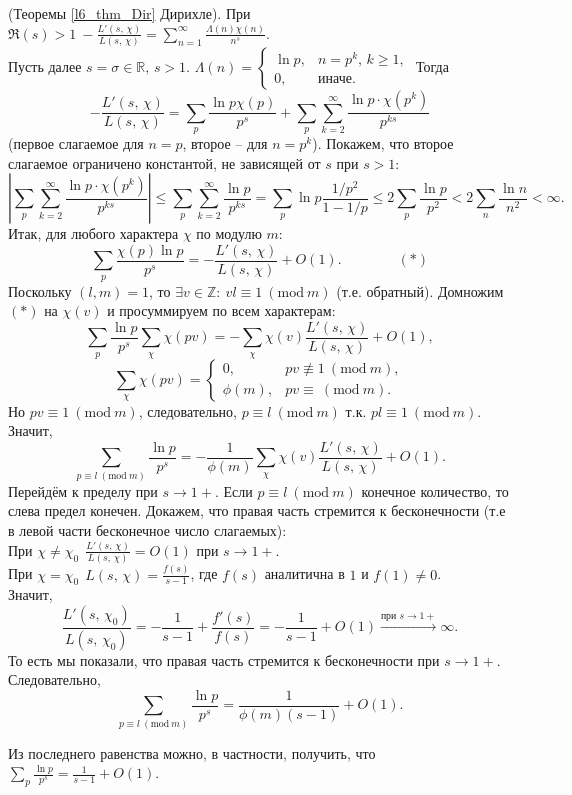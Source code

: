 \begin{pf} (Теоремы \ref{l6_thm_Dir} Дирихле).
	При $\displaystyle \Re(s)>1 \ -\frac{L'(s,\,\chi)}{L(s,\,\chi)} = \sum\limits_{n=1}^\infty \frac{\Lambda(n)\chi(n)}{n^s}$.\\
	Пусть далее $s=\sigma \in \mathbb{R}, \, s>1$. $\Lambda(n) =
	\begin{cases}
		\ln p, & n=p^k,\,k\geq1,\\
		0, & \text{иначе.}
	\end{cases}$
	Тогда
	$$-\frac{L'(s,\,\chi)}{L(s,\,\chi)} = \sum\limits_p \frac{\ln p \chi(p)}{p^s} + \sum\limits_p \sum\limits_{k=2}^\infty \frac{\ln p \cdot \chi\left( p^k \right)}{p^{ks}}$$ (первое слагаемое для $n=p$, второе -- для $n=p^k$). Покажем, что второе слагаемое ограничено константой, не зависящей от $s$ при $s>1$:
	$$\left| \sum\limits_p \sum\limits_{k=2}^\infty \frac{\ln p \cdot \chi\left( p^k \right)}{p^{ks}} \right| \leq \sum\limits_p \sum\limits_{k=2}^\infty \frac{\ln p}{p^{ks}} = \sum\limits_p \ln p \frac{1/p^2}{1-1/p} \leq 2\sum\limits_p \frac{\ln p}{p^2} < 2\sum\limits_n \frac{\ln n}{n^2} < \infty.$$
	Итак, для любого характера $\chi$ по модулю $m$:
	$$\sum\limits_p \frac{\chi(p)\ln p}{p^s} = -\frac{L'(s,\,\chi)}{L(s,\,\chi)} + O(1). \qquad \qquad (\ast)$$
	Поскольку $(l, m) =1$, то $\exists v \in \mathbb{Z}: \ vl \equiv 1 \ (\mathrm{mod} \ m)$ (т.е. обратный).
	Домножим $(\ast)$ на $\chi(v)$ и просуммируем по всем характерам:
	$$\sum\limits_p \frac{\ln p}{p^s} \sum\limits_\chi \chi(pv) = -\sum\limits_\chi \chi(v)\frac{L'(s,\,\chi)}{L(s,\,\chi)} + O(1),$$
	$$\sum\limits_\chi \chi(pv) =
	\begin{cases}
		0, & pv \not\equiv 1 \ (\mathrm{mod} \ m),\\
		\phi(m), & pv \equiv \ (\mathrm{mod} \ m).
	\end{cases}$$
	Но $pv \equiv 1 \ (\mathrm{mod} \ m)$, следовательно, $p \equiv l \ (\mathrm{mod} \ m)$ т.к. $pl \equiv 1 \ (\mathrm{mod} \ m)$. Значит,
	$$\sum\limits_{p \equiv l \ (\mathrm{mod} \ m)} \frac{\ln p}{p^s} = -\frac{1}{\phi(m)} \sum\limits_\chi \chi(v)\frac{L'(s,\,\chi)}{L(s,\,\chi)} + O(1).$$
	Перейдём к пределу при $s \to 1+$. Если $p \equiv l \ (\mathrm{mod} \ m)$ конечное количество, то слева предел конечен. Докажем, что правая часть стремится к бесконечности (т.е в левой части бесконечное число слагаемых):\\
	При $\displaystyle \chi \ne \chi_0 \ \ \frac{L'(s,\,\chi)}{L(s,\,\chi)} = O(1)$ при $s \to 1+$.\\
	При $\displaystyle \chi = \chi_0 \ \ L(s,\,\chi) = \frac{f(s)}{s-1}$, где $f(s)$ аналитична в $1$ и $f(1) \ne 0$.\\
	Значит,
	$$\frac{L'(s,\,\chi_0)}{L(s,\,\chi_0)} = -\frac{1}{s-1} + \frac{f'(s)}{f(s)} = -\frac{1}{s-1} + O(1) \xrightarrow{\text{при } s\to1+} \infty.$$
	То есть мы показали, что правая часть стремится к бесконечности при $s \to 1+$. Следовательно,
	$$\sum\limits_{p \equiv l \ (\mathrm{mod} \ m)} \frac{\ln p}{p^s} = \frac{1}{\phi(m)(s-1)} + O(1).$$
\end{pf}
Из последнего равенства можно, в частности, получить, что $\displaystyle \sum\limits_p \frac{\ln p}{p^s} = \frac{1}{s-1} + O(1)$.\\

